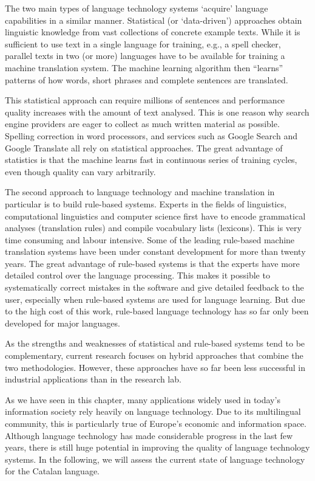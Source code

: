 \begin{multicols}{2}

    The two main types of language technology systems ‘acquire’ language capabilities in a similar manner. Statistical (or ‘data-driven’) approaches obtain linguistic knowledge from vast collections of concrete example texts. While it is sufficient to use text in a single language for training, e.g., a spell checker, parallel texts in two (or more) languages have to be available for training a machine translation system. The machine learning algorithm then “learns” patterns of how words, short phrases and complete sentences are translated. 

    This statistical approach can require millions of sentences and performance quality increases with the amount of text analysed. This is one reason why search engine providers are eager to collect as much written material as possible. Spelling correction in word processors, and services such as Google Search and Google Translate all rely on statistical approaches. The great advantage of statistics is that the machine learns fast in continuous series of training cycles, even though quality can vary arbitrarily.

    The second approach to language technology and machine translation in particular is to build rule-based systems. Experts in the fields of linguistics, computational linguistics and computer science first have to encode grammatical analyses (translation rules) and compile vocabulary lists (lexicons). This is very time consuming and labour intensive. Some of the leading rule-based machine translation systems have been under constant development for more than twenty years. The great advantage of rule-based systems is that the experts have more detailed control over the language processing. This makes it possible to systematically correct mistakes in the software and give detailed feedback to the user, especially when rule-based systems are used for language learning. But due to the high cost of this work, rule-based language technology has so far only been developed for major languages. 
    

    As the strengths and weaknesses of statistical and rule-based systems tend to be complementary, current research focuses on hybrid approaches that combine the two methodologies. However, these approaches have so far been less successful in industrial applications than in the research lab. 

    As we have seen in this chapter, many applications widely used in today’s information society rely heavily on language technology. Due to its multilingual community, this is particularly true of Europe’s economic and information space. Although language technology has made considerable progress in the last few years, there is still huge potential in improving the quality of language technology systems. In the following, we will assess the current state of language technology for the Catalan language.
\end{multicols}

